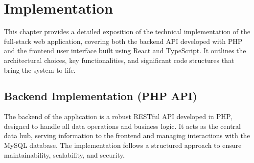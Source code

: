 \documentclass{report}
\begin{document}
\chapter{Implementation}
\label{chap:implementation}
This chapter provides a detailed exposition of the technical implementation of the full-stack web application, covering both the backend API developed with PHP and the frontend user interface built using React and TypeScript. It outlines the architectural choices, key functionalities, and significant code structures that bring the system to life.

\section{Backend Implementation (PHP API)}
\label{sec:backend_implementation}
The backend of the application is a robust RESTful API developed in PHP, designed to handle all data operations and business logic. It acts as the central data hub, serving information to the frontend and managing interactions with the MySQL database. The implementation follows a structured approach to ensure maintainability, scalability, and security.
\end{document}
